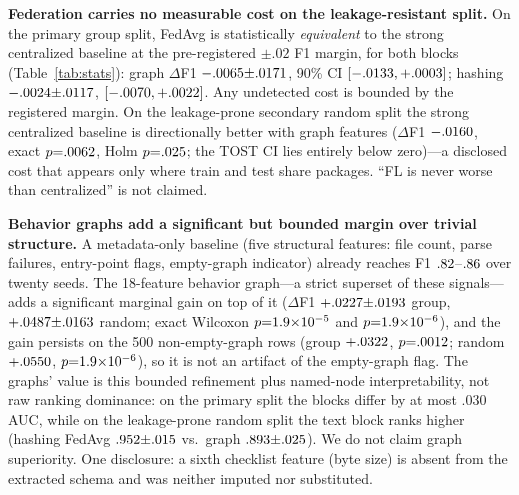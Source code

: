 \documentclass[sigconf,nonacm]{acmart}
\begin{document}
\textbf{Federation carries no measurable cost on the leakage-resistant
split.} On the primary group split, FedAvg is statistically
\emph{equivalent} to the strong centralized baseline at the
pre-registered $\pm.02$ F1 margin, for both blocks (Table~\ref{tab:stats}):
graph $\Delta$F1 $-.0065{\pm}.0171$, 90\%
CI $[-.0133,+.0003]$; hashing
$-.0024{\pm}.0117$,
$[-.0070,+.0022]$. Any undetected cost is
bounded by the registered margin. On the leakage-prone secondary random
split the strong centralized baseline is directionally better with graph
features ($\Delta$F1 $-.0160$, exact
$p{=}.0062$, Holm $p{=}.025$; the TOST
CI lies entirely below zero)---a disclosed cost that appears only where
train and test share packages. ``FL is never worse than centralized'' is
not claimed.

\textbf{Behavior graphs add a significant but bounded margin over trivial
structure.} A metadata-only baseline (five structural features: file
count, parse failures, entry-point flags, empty-graph indicator) already
reaches F1 $.82$--$.86$ over twenty seeds. The
18-feature behavior graph---a strict superset of these signals---adds a
significant marginal gain on top of it ($\Delta$F1
$+.0227{\pm}.0193$ group,
$+.0487{\pm}.0163$ random; exact
Wilcoxon $p{=}1.9{\times}10^{-5}$ and $p{=}1.9{\times}10^{-6}$), and the
gain persists on the 500 non-empty-graph rows (group
$+.0322$, $p{=}.0012$; random
$+.0550$, $p{=}1.9{\times}10^{-6}$), so it is not an
artifact of the empty-graph flag. The graphs' value is this bounded
refinement plus named-node interpretability, not raw ranking dominance:
on the primary split the blocks differ by at most $.030$ AUC, while on
the leakage-prone random split the text block ranks higher (hashing
FedAvg $.952{\pm}.015$
vs.\ graph $.893{\pm}.025$).
We do not claim graph superiority. One disclosure: a sixth checklist
feature (byte size) is absent from the extracted schema and was neither
imputed nor substituted.
\end{document}

